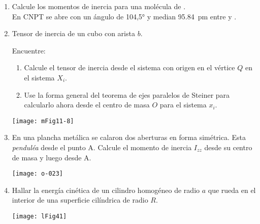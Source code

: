 \documentclass[11pt,spanish,a4paper]{article}
\begin{document}
\begin{enumerate}
\item Calcule los momentos de inercia para una molécula de .\\
En CNPT se abre con un ángulo de \ang{104,5;;} y median \SI{95.84}{\pico\metre} entre  y .



\item 
\begin{minipage}[t][3.7cm]{0.6\textwidth}
Tensor de inercia de un cubo con arista \(b\).
	
Encuentre: 
\begin{enumerate}
	\item Calcule el tensor de inercia desde el sistema con origen en el vértice \(Q\) en el sistema \(X_i\).
	\item Use la forma general del teorema de ejes paralelos de Steiner para calcularlo ahora desde el centro de masa \(O\) para el sistema \(x_i\).
	\end{enumerate}
\end{minipage}
\begin{minipage}[c][1.2cm][t]{0.35\textwidth}
	\texttt{[image: mFig11-8]}
\end{minipage}



\item 
\begin{minipage}[t][3cm]{0.5\textwidth}
En una plancha metálica se calaron dos aberturas en forma simétrica.
Esta \emph{penduléa} desde el punto A.
Calcule el momento de inercia \(I_{zz}\) desde su centro de masa y luego desde A.
\end{minipage}
\begin{minipage}[c][4cm][t]{0.45\textwidth}
	\texttt{[image: o-023]}
\end{minipage}



\item 
\begin{minipage}[t][1.5cm]{0.65\textwidth}
	Hallar la energía cinética de un cilindro homogéneo de radio \(a\) que rueda en el interior de una superficie cilíndrica de radio \(R\).
\end{minipage}
\begin{minipage}[c][1.5cm][t]{0.3\textwidth}
\texttt{[image: lFig41]}
\end{minipage}




\end{enumerate}
\end{document}
